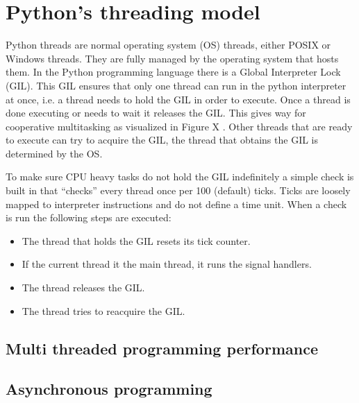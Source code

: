 \chapter{Python's threading model}

Python threads are normal operating system (OS) threads, either POSIX or Windows threads.
They are fully managed by the operating system that hosts them.
In the Python programming language there is a Global Interpreter Lock (GIL).
This GIL ensures that only one thread can run in the python interpreter at once, i.e. a thread needs to hold the GIL in order to execute.
Once a thread is done executing or needs to wait it releases the GIL.
This gives way for cooperative multitasking as visualized in Figure X .
Other threads that are ready to execute can try to acquire the GIL, the thread that obtains the GIL is determined by the OS.

To make sure CPU heavy tasks do not hold the GIL indefinitely a simple check is built in that ``checks'' every thread once per 100 (default) ticks.
Ticks are loosely mapped to interpreter instructions and do not define a time unit.
When a check is run the following steps are executed:
\begin{itemize}
	\item The thread that holds the GIL resets its tick counter.
	\item If the current thread it the main thread, it runs the signal handlers.
	\item The thread releases the GIL.
	\item The thread tries to reacquire the GIL.
\end{itemize}



\section{Multi threaded programming performance}

\section{Asynchronous programming}
